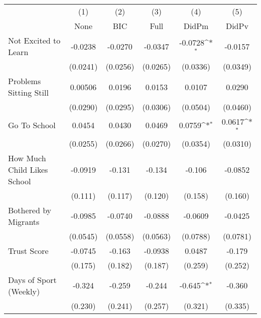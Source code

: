 {
\def\sym#1{\ifmmode^{#1}\else\(^{#1}\)\fi}
\begin{tabular}{l*{5}{c}}
\toprule
            &\multicolumn{1}{c}{(1)}&\multicolumn{1}{c}{(2)}&\multicolumn{1}{c}{(3)}&\multicolumn{1}{c}{(4)}&\multicolumn{1}{c}{(5)}\\
            &\multicolumn{1}{c}{None}&\multicolumn{1}{c}{BIC}&\multicolumn{1}{c}{Full}&\multicolumn{1}{c}{DidPm}&\multicolumn{1}{c}{DidPv}\\
\midrule
Not Excited to Learn&     -0.0238         &     -0.0270         &     -0.0347         &     -0.0728\sym{*}  &     -0.0157         \\
            &    (0.0241)         &    (0.0256)         &    (0.0265)         &    (0.0336)         &    (0.0349)         \\
\addlinespace
Problems Sitting Still&     0.00506         &      0.0196         &      0.0153         &      0.0107         &      0.0290         \\
            &    (0.0290)         &    (0.0295)         &    (0.0306)         &    (0.0504)         &    (0.0460)         \\
\addlinespace
Go To School&      0.0454         &      0.0430         &      0.0469         &      0.0759\sym{*}  &      0.0617\sym{*}  \\
            &    (0.0255)         &    (0.0266)         &    (0.0270)         &    (0.0354)         &    (0.0310)         \\
\addlinespace
How Much Child Likes School&     -0.0919         &      -0.131         &      -0.134         &      -0.106         &     -0.0852         \\
            &     (0.111)         &     (0.117)         &     (0.120)         &     (0.158)         &     (0.160)         \\
\addlinespace
Bothered by Migrants&     -0.0985         &     -0.0740         &     -0.0888         &     -0.0609         &     -0.0425         \\
            &    (0.0545)         &    (0.0558)         &    (0.0563)         &    (0.0788)         &    (0.0781)         \\
\addlinespace
Trust Score &     -0.0745         &      -0.163         &     -0.0938         &      0.0487         &      -0.179         \\
            &     (0.175)         &     (0.182)         &     (0.187)         &     (0.259)         &     (0.252)         \\
\addlinespace
Days of Sport (Weekly)&      -0.324         &      -0.259         &      -0.244         &      -0.645\sym{*}  &      -0.360         \\
            &     (0.230)         &     (0.241)         &     (0.257)         &     (0.321)         &     (0.335)         \\
\bottomrule
\end{tabular}
}
